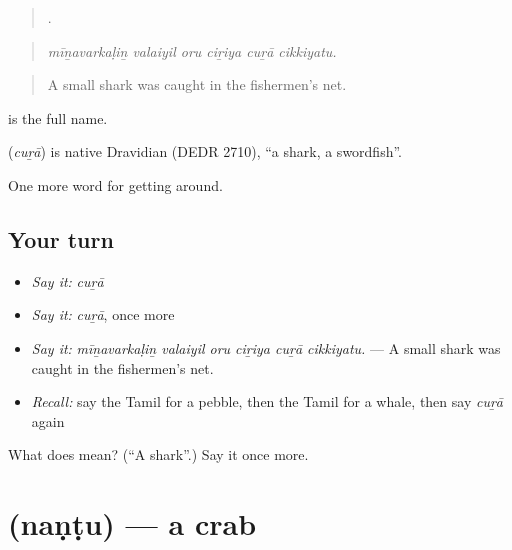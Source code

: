 \begin{quote}
     .
\end{quote}

\begin{quote}
\emph{mīṉavarkaḷiṉ valaiyil oru ciṟiya cuṟā cikkiyatu.}
\end{quote}

\begin{quote}
A small shark was caught in the fishermen's net.
\end{quote}

 is the full name.

\begin{cousinweb}
\textbf{} (\emph{cuṟā}) is native Dravidian (DEDR 2710), \textquotedblleft{}a shark, a swordfish\textquotedblright{}.
\end{cousinweb}

\begin{grammarlens}[title={What you've built}]
One more word for getting around.
\end{grammarlens}

\subsection*{Your turn}
\begin{itemize}
\raggedright
  \item \emph{Say it:} \emph{cuṟā}
  \item \emph{Say it:} \emph{cuṟā}, once more
  \item \emph{Say it:} \emph{mīṉavarkaḷiṉ valaiyil oru ciṟiya cuṟā cikkiyatu.} — A small shark was caught in the fishermen's net.
  \item \emph{Recall:} say the Tamil for a pebble, then the Tamil for a whale, then say \emph{cuṟā} again
\end{itemize}

\begin{tcolorbox}[breakable,colback=teal!4,colframe=teal!35!black,title={Before you move on}]
What does  mean? (\textquotedblleft{}A shark\textquotedblright{}.) Say it once more.
\end{tcolorbox}
\section[\texorpdfstring{\ta{நண்டு} (naṇṭu)}{நண்டு (naṇṭu)}]{ (naṇṭu) — a crab}

\label{lesson:TA-C436-nantu}



